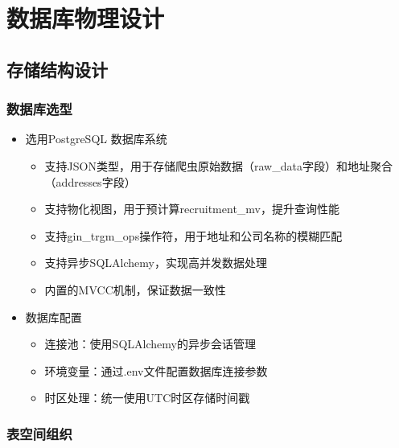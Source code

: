 \section{数据库物理设计}

\subsection{存储结构设计}

\subsubsection{数据库选型}
\begin{itemize}
  \item 选用PostgreSQL 数据库系统
  \begin{itemize}
    \item 支持JSON类型，用于存储爬虫原始数据（raw\_data字段）和地址聚合（addresses字段）
    \item 支持物化视图，用于预计算recruitment\_mv，提升查询性能
    \item 支持gin\_trgm\_ops操作符，用于地址和公司名称的模糊匹配
    \item 支持异步SQLAlchemy，实现高并发数据处理
    \item 内置的MVCC机制，保证数据一致性
  \end{itemize}
  \item 数据库配置
  \begin{itemize}
    \item 连接池：使用SQLAlchemy的异步会话管理
    \item 环境变量：通过.env文件配置数据库连接参数
    \item 时区处理：统一使用UTC时区存储时间戳
  \end{itemize}
\end{itemize}

\subsubsection{表空间组织}

